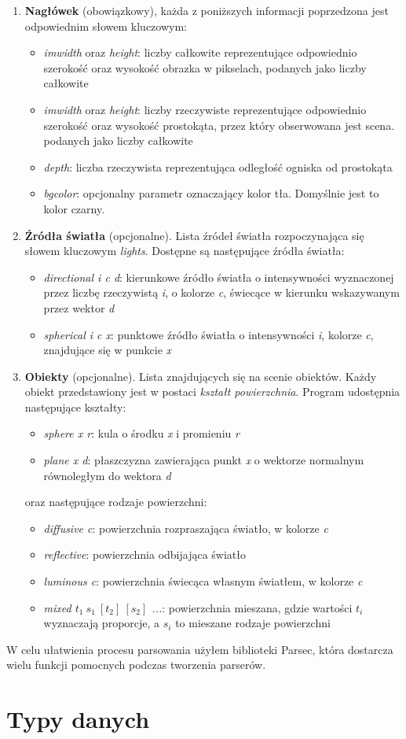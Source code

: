 \documentclass[11pt,a4paper]{article}
\begin{document}
\begin{enumerate}
\item\textbf{Nagłówek} (obowiązkowy), każda z poniższych informacji poprzedzona jest odpowiednim słowem kluczowym:
\begin{itemize}
\item\textit{imwidth} oraz \textit{height}: liczby całkowite reprezentujące odpowiednio szerokość oraz wysokość obrazka w pikselach, podanych jako liczby całkowite
\item\textit{imwidth} oraz \textit{height}: liczby rzeczywiste reprezentujące odpowiednio szerokość oraz wysokość prostokąta, przez który obserwowana jest scena. podanych jako liczby całkowite
\item\textit{depth}: liczba rzeczywista reprezentująca odległość ogniska od prostokąta
\item\textit{bgcolor}: opcjonalny parametr oznaczający kolor tła. Domyślnie jest to kolor czarny.
\end{itemize}
\item\textbf{Źródła światła} (opcjonalne). Lista źródeł światła rozpoczynająca się słowem kluczowym \textit{lights}. Dostępne są następujące źródła światła:
\begin{itemize}
\item\textit{directional i c d}: kierunkowe źródło światła o intensywności wyznaczonej przez liczbę rzeczywistą \textit{i}, o kolorze \textit{c}, świecące w kierunku wskazywanym przez wektor \textit{d}
\item\textit{spherical i c x}: punktowe źródło światła o intensywności \textit{i}, kolorze \textit{c}, znajdujące się w punkcie \textit{x}
\end{itemize}
\item\textbf{Obiekty} (opcjonalne). Lista znajdujących się na scenie obiektów. Każdy obiekt przedstawiony jest w postaci \textit{kształt powierzchnia}. Program udostępnia następujące kształty:
\begin{itemize}
\item\textit{sphere x r}: kula o środku \textit{x} i promieniu \textit{r}
\item\textit{plane x d}: płaszczyzna zawierająca punkt \textit{x} o wektorze normalnym równoległym do wektora \textit{d}
\end{itemize}
oraz następujące rodzaje powierzchni:
\begin{itemize}
\item\textit{diffusive c}: powierzchnia rozpraszająca światło, w kolorze \textit{c}
\item\textit{reflective}: powierzchnia odbijająca światło
\item\textit{luminous c}: powierzchnia świecąca własnym światłem, w kolorze \textit{c}
\item\textit{mixed $t_{1}\ s_{1}\ [t_{2}]\ [s_{2}]$ ...}: powierzchnia mieszana, gdzie wartości \textit{$t_{i}$} wyznaczają proporcje, a \textit{$s_{i}$} to mieszane rodzaje powierzchni
\end{itemize}
\end{enumerate}
W celu ułatwienia procesu parsowania użyłem biblioteki Parsec, która dostarcza wielu funkcji pomocnych podczas tworzenia parserów.
\section{Typy danych}
\end{document}
